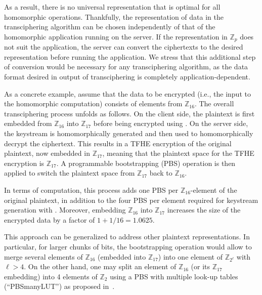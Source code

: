 As a result, there is no universal representation that is optimal for all homomorphic operations. Thankfully, the representation of data in the transciphering algorithm can be chosen independently of that of the homomorphic application running on the server. If the representation in $\mathbb Z_p$ does not suit the application, the server can convert the ciphertexts to the desired representation before running the application. %
We stress that this additional step of conversion would be necessary for any transciphering algorithm, as the data format desired in output of transciphering is completely application-dependent.

	
As a concrete example, assume that the data to be encrypted (i.e., the input to the homomorphic computation) consists of elements from $\mathbb{Z}_{16}$. The overall transciphering process unfolds as follows. On the client side, the plaintext is first embedded from $\mathbb{Z}_{16}$ into $\mathbb{Z}_{17}$ before being encrypted using \coolName. On the server side, the keystream is homomorphically generated and then used to homomorphically decrypt the ciphertext. This results in a TFHE encryption of the original plaintext, now embedded in $\mathbb{Z}_{17}$, meaning that the plaintext space for the TFHE encryption is $\mathbb{Z}_{17}$. A programmable bootstrapping (PBS) operation is then applied to switch the plaintext space from $\mathbb{Z}_{17}$ back to $\mathbb{Z}_{16}$.

In terms of computation, this process adds one PBS per $\mathbb{Z}_{16}$-element of the original plaintext, in addition to the four PBS per element required for keystream generation with \coolName. Moreover, embedding $\mathbb{Z}_{16}$ into $\mathbb{Z}_{17}$ increases the size of the encrypted data by a factor of $1 + 1/16 = 1.0625$.

This approach can be generalized to address other plaintext representations. In particular, for larger chunks of bits, the bootstrapping operation would allow to merge several elements of $\mathbb{Z}_{16}$ (embedded into $\mathbb{Z}_{17}$) into one element of $\mathbb{Z}_{2^\ell}$ with $\ell > 4$. On the other hand, one may split an element of $\mathbb{Z}_{16}$ (or its $\mathbb{Z}_{17}$ embedding) into 4 elements of $\mathbb{Z}_{2}$ using a PBS with multiple look-up tables (``PBSmanyLUT'') as proposed in~\cite{AC:CLOT21}.



